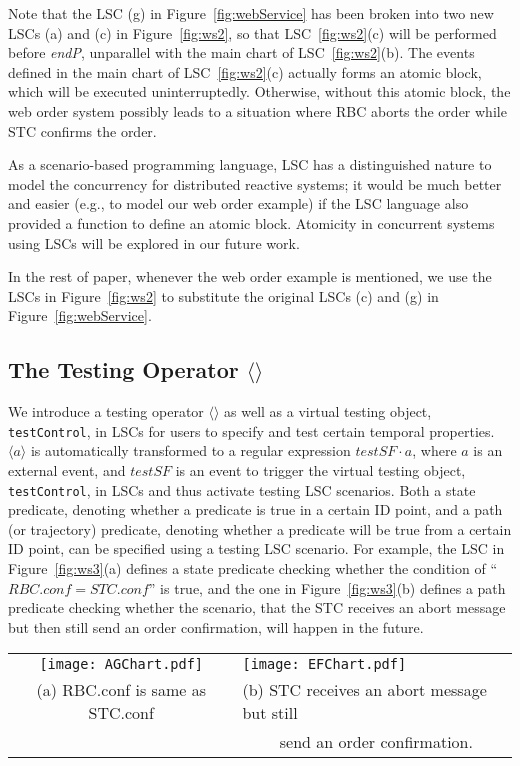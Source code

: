 \documentclass[]{llncs}
\begin{document}
Note that the LSC (g) in Figure~\ref{fig:webService} has been
broken into two new LSCs (a) and (c) in Figure~\ref{fig:ws2},
so that LSC~\ref{fig:ws2}(c) will be performed before {\em endP},
unparallel with the main chart of LSC~\ref{fig:ws2}(b).
The events defined in the main chart of LSC~\ref{fig:ws2}(c)
actually forms an atomic block, which will be executed uninterruptedly.
Otherwise, without this atomic block, the web order system possibly leads to
a situation where RBC aborts the order while STC confirms the order.

As a scenario-based programming language, LSC has a distinguished nature
to model the concurrency for distributed reactive systems;
it would be much better and easier (e.g., to model our web order example)
if the LSC language also provided a function to define an atomic block.
Atomicity in concurrent systems using LSCs will be explored in our future work.

In the rest of paper, whenever the web order example is mentioned,
we use the LSCs in Figure~\ref{fig:ws2} to substitute the original
LSCs (c) and (g) in Figure~\ref{fig:webService}.

\subsection{The Testing Operator $\langle\rangle$}

We introduce a testing operator $\langle\rangle$ as well as a virtual
testing object, {\tt testControl}, in LSCs  for users to specify
and test certain temporal properties. $\langle a\rangle$ is automatically
transformed to a regular expression $testSF\cdot a$, where $a$ is
an external event, and $testSF$ is an event to trigger the
virtual testing object, {\tt testControl}, in LSCs and
thus activate testing LSC scenarios.
Both a state predicate, denoting whether a predicate is true
in a certain ID point, and a path (or trajectory) predicate,
denoting whether a predicate will be true from a certain ID point,
can be specified using a testing LSC scenario.
For example, the LSC in Figure~\ref{fig:ws3}(a) defines a
state predicate checking whether the condition of
``$RBC.conf=STC.conf$'' is true, and the one in Figure~\ref{fig:ws3}(b)
defines a path predicate checking whether the scenario,
that the STC receives an abort message but then still
send an order confirmation, will happen in the future.

\begin{figure*}[!ht]
	\centering
	\begin{tabular}{cl}
		\texttt{[image: AGChart.pdf]}
		&
		\texttt{[image: EFChart.pdf]} \\
	  (a) RBC.conf is same as STC.conf
	  &
	  (b) STC receives an abort message but still\\
	  & ~~~~ send an order confirmation.
	\end{tabular}
\caption{State and Path predicates specification}
\label{fig:ws3}
\end{figure*}
\end{document}
